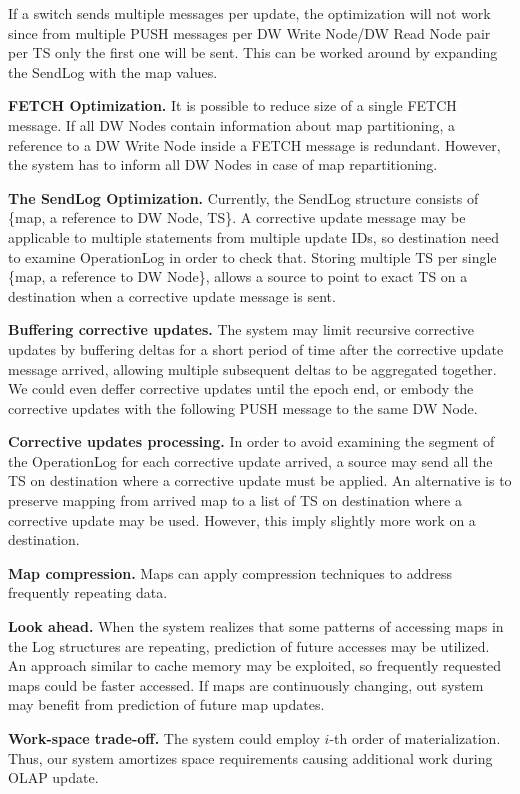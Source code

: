 \documentclass{sig-semester}
\def\OLAP{OLAP\xspace}
\begin{document}
If a switch sends multiple messages per update, the optimization will not work since from multiple PUSH messages per DW Write Node/DW Read Node pair per TS only the first one will be sent. This can be worked around by expanding the SendLog with the map values. 

\textbf{FETCH Optimization.} It is possible to reduce size of a single FETCH message. If all DW Nodes contain information about map partitioning, a reference to a DW Write Node inside a FETCH message is redundant. However, the system has to inform all DW Nodes in case of map repartitioning.

\textbf{The SendLog Optimization.} Currently, the SendLog structure consists of \{map, a reference to DW Node, TS\}. A corrective update message may be applicable to multiple statements from multiple update IDs, so destination need to examine OperationLog in order to check that. Storing multiple TS per single \{map, a reference to DW Node\}, allows a source to point to exact TS on a destination when a corrective update message is sent.

\textbf{Buffering corrective updates.} The system may limit recursive corrective updates by buffering deltas for a short period of time after the corrective update message arrived, allowing multiple subsequent deltas to be aggregated together. We could even deffer corrective updates until the epoch end, or embody the corrective updates with the following PUSH message to the same DW Node.

\textbf{Corrective updates processing.} In order to avoid examining the segment of the OperationLog for each corrective update arrived, a source may send all the TS on destination where a corrective update must be applied. An alternative is to preserve mapping from arrived map to a list of TS on destination where a corrective update may be used. However, this imply slightly more work on a destination.

\textbf{Map compression.} Maps can apply compression techniques to address frequently repeating data.

\textbf{Look ahead.} When the system realizes that some patterns of accessing maps in the Log structures are repeating, prediction of future accesses may be utilized. An approach similar to cache memory may be exploited, so frequently requested maps could be faster accessed. If maps are continuously changing, out system may benefit from prediction of future map updates.

\textbf{Work-space trade-off. } The system could employ $i$-th order of materialization. Thus, our system amortizes space requirements causing additional work during \OLAP update.
\end{document}
